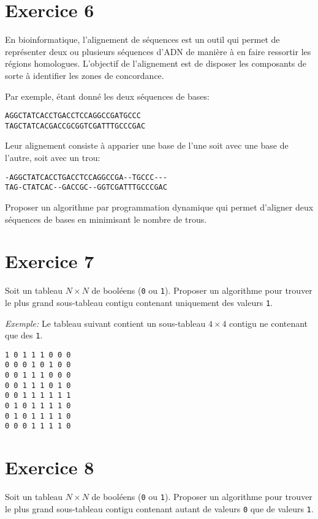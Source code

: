 \documentclass[a4paper,10pt]{article}
\begin{document}
\section*{Exercice 6}

En bioinformatique, l'alignement de séquences est un outil qui permet de représenter
deux ou plusieurs séquences d'ADN de manière à en faire ressortir les régions
homologues. L'objectif de l'alignement est de disposer les composants de sorte
à identifier les zones de concordance.

Par exemple, étant donné les deux séquences de bases:

\begin{verbatim}
AGGCTATCACCTGACCTCCAGGCCGATGCCC
TAGCTATCACGACCGCGGTCGATTTGCCCGAC
\end{verbatim}

Leur alignement consiste à apparier une base de l'une soit avec une base de
l'autre, soit avec un trou:

\begin{verbatim}
-AGGCTATCACCTGACCTCCAGGCCGA--TGCCC---
TAG-CTATCAC--GACCGC--GGTCGATTTGCCCGAC
\end{verbatim}

Proposer un algorithme par programmation dynamique qui permet d'aligner deux séquences de bases en minimisant le nombre de trous.


\section*{Exercice 7}

Soit un tableau $N \times N$ de booléens (\texttt{0} ou \texttt{1}). Proposer un algorithme pour trouver le plus grand sous-tableau contigu contenant uniquement des valeurs \texttt{1}.

\textit{Exemple:} Le tableau suivant contient un sous-tableau $4 \times 4$ contigu ne contenant que des \texttt{1}.

\begin{verbatim}
1 0 1 1 1 0 0 0
0 0 0 1 0 1 0 0
0 0 1 1 1 0 0 0
0 0 1 1 1 0 1 0
0 0 1 1 1 1 1 1
0 1 0 1 1 1 1 0
0 1 0 1 1 1 1 0
0 0 0 1 1 1 1 0
\end{verbatim}


\section*{Exercice 8}

Soit un tableau $N \times N$ de booléens (\texttt{0} ou \texttt{1}). Proposer un algorithme pour trouver le plus grand sous-tableau contigu contenant autant de valeurs \texttt{0} que de valeurs \texttt{1}.
\end{document}
